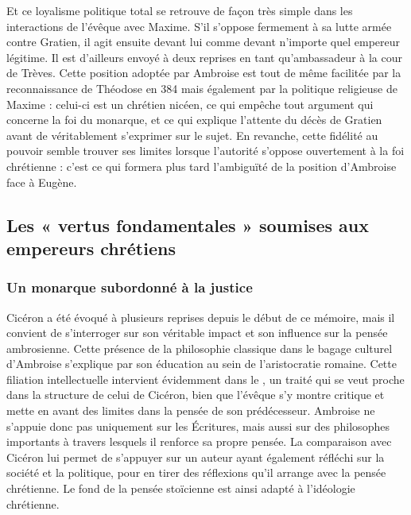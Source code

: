Et ce loyalisme politique total se retrouve de façon très simple dans les interactions de l'évêque avec Maxime. S'il s'oppose fermement à sa lutte armée contre Gratien, il agit ensuite devant lui comme devant n'importe quel empereur légitime. Il est d'ailleurs envoyé à deux reprises en tant qu'ambassadeur à la cour de Trèves. Cette position adoptée par Ambroise est tout de même facilitée par la reconnaissance de Théodose en 384 mais également par la politique religieuse de Maxime : celui-ci est un chrétien nicéen, ce qui empêche tout argument qui concerne la foi du monarque, et ce qui explique l'attente du décès de Gratien avant de véritablement s'exprimer sur le sujet. En revanche, cette fidélité au pouvoir semble trouver ses limites lorsque l’autorité s’oppose ouvertement à la foi chrétienne : c’est ce qui formera plus tard l'ambiguïté de la position d’Ambroise face à Eugène.

\bigskip

\subsection{Les « vertus fondamentales » soumises aux empereurs chrétiens}

\subsubsection{Un monarque subordonné à la justice}

Cicéron a été évoqué à plusieurs reprises depuis le début de ce mémoire, mais il convient de s'interroger sur son véritable impact et son influence sur la pensée ambrosienne. Cette présence de la philosophie classique dans le bagage culturel d'Ambroise s'explique par son éducation au sein de l'aristocratie romaine. Cette filiation intellectuelle intervient évidemment dans le , un traité qui se veut proche dans la structure de celui de Cicéron, bien que l'évêque s'y montre critique et mette en avant des limites dans la pensée de son prédécesseur\autocite{lanery_magistere}. Ambroise ne s'appuie donc pas uniquement sur les Écritures, mais aussi sur des philosophes importants à travers lesquels il renforce sa propre pensée. La comparaison avec Cicéron lui permet de s'appuyer sur un auteur ayant également réfléchi sur la société et la politique, pour en tirer des réflexions qu'il arrange avec la pensée chrétienne. Le fond de la pensée stoïcienne est ainsi adapté à l'idéologie chrétienne.

\bigskip

